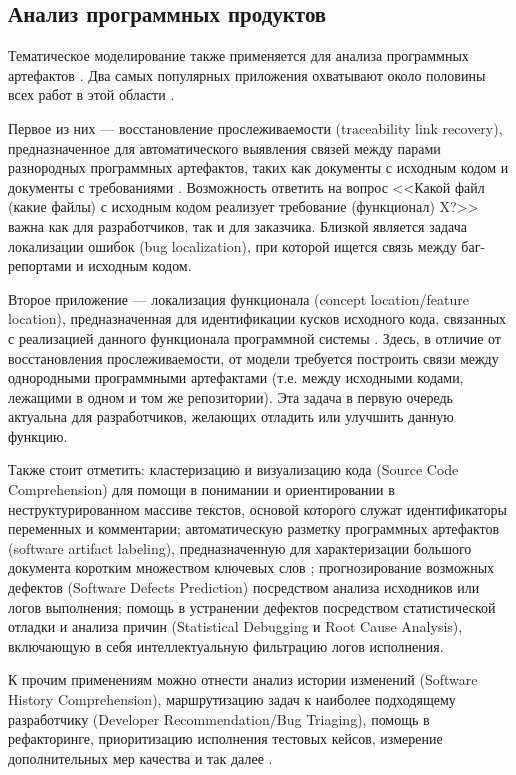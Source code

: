 \subsection{Анализ программных продуктов}

Тематическое моделирование также применяется для анализа программных артефактов \cite{sun2016exploring,chen2016survey}. Два самых популярных приложения охватывают около половины всех работ в этой области \cite{chen2016survey}.

Первое из них --- восстановление прослеживаемости (traceability link recovery), предназначенное для автоматического выявления связей между парами разнородных программных артефактов, таких как документы с исходным кодом и документы с требованиями \cite{asuncion2010software}. Возможность ответить на вопрос <<Какой файл (какие файлы) с исходным кодом реализует требование (функционал) X?>> важна как для разработчиков, так и для заказчика. Близкой является задача локализации ошибок (bug localization), при которой ищется связь между баг-репортами и исходным кодом.

Второе приложение --- локализация функционала (concept location/feature location), предназначенная для идентификации кусков исходного кода, связанных с реализацией данного функционала программной системы \cite{dit2013feature}. Здесь, в отличие от восстановления прослеживаемости, от модели требуется построить связи между однородными программными артефактами (т.е. между исходными кодами, лежащими в одном и том же репозитории). Эта задача в первую очередь актуальна для разработчиков, желающих отладить или улучшить данную функцию.

Также стоит отметить: кластеризацию и визуализацию кода  (Source Code Comprehension) для помощи в понимании и ориентировании в неструктурированном массиве текстов, основой которого служат идентификаторы переменных и комментарии; автоматическую разметку программных артефактов (software artifact labeling), предназначенную для характеризации большого документа коротким множеством ключевых слов \cite{de2012using}; прогнозирование возможных дефектов (Software Defects Prediction) посредством анализа исходников или логов выполнения; помощь в  устранении дефектов посредством статистической отладки и анализа причин (Statistical Debugging и Root Cause Analysis), включающую в себя интеллектуальную фильтрацию логов исполнения.

К прочим применениям можно отнести анализ истории изменений (Software History Comprehension), маршрутизацию задач к наиболее подходящему разработчику (Developer Recommendation/Bug Triaging), помощь в рефакторинге, приоритизацию исполнения тестовых кейсов, измерение дополнительных мер качества и так далее \cite{sun2016exploring,chen2016survey}.

